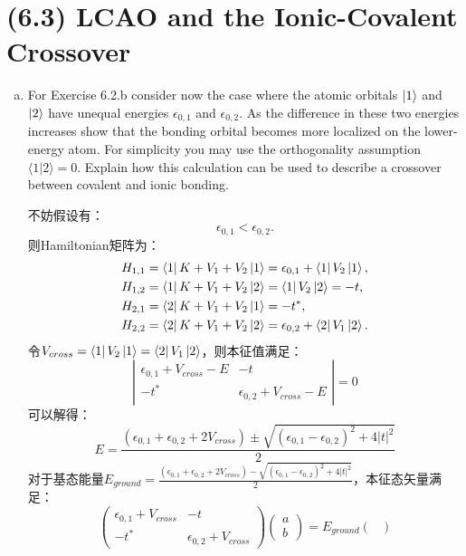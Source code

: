 \documentclass[reqno,a4paper,12pt]{amsart}
\begin{document}
\section{\textbf{(6.3) LCAO and the Ionic-Covalent Crossover}}
\begin{enumerate}[(a)]
	\item For Exercise 6.2.b consider now the case where the atomic orbitals $\ket{1}$ and $\ket{2}$ have unequal energies $\epsilon_{0,1}$ and $\epsilon_{0,2}$. As the difference in these two energies increases show that the bonding orbital becomes more localized on the lower-energy atom. For simplicity you may use the orthogonality assumption $\langle 1 \vert 2 \rangle = 0$. Explain how this calculation can be used to describe a crossover between covalent and ionic bonding. 
	\begin{tcolorbox}[breakable, colback = black!5!white, colframe = black]
	不妨假设有：
	\[
		\epsilon_{0,1} < \epsilon_{0,2}.
	\]
	则Hamiltonian矩阵为：
	\begin{align*}
		H_{1,1} &= \bra{1} K + V_1 + V_2 \ket{1} = \epsilon_{0,1} + \bra{1} V_2 \ket{1}, \\
		H_{1,2} &= \bra{1} K + V_1 + V_2 \ket{2} = \bra{1} V_2 \ket{2} = -t, \\
		H_{2,1} &= \bra{2} K + V_1 + V_2 \ket{1} = -t^*, \\
		H_{2,2} &= \bra{2} K + V_1 + V_2 \ket{2} = \epsilon_{0,2} + \bra{2} V_1 \ket{2}.
	\end{align*}
	令$V_{cross} = \bra{1} V_2 \ket{1} = \bra{2} V_1 \ket{2}$，则本征值满足：
	\[
		\left\vert \begin{matrix}
			\epsilon_{0,1} + V_{cross} - E & -t \\
			-t^* & \epsilon_{0,2} + V_{cross} - E
		\end{matrix}\right\vert = 0
	\]
	可以解得：
	\[
		E = \frac{(\epsilon_{0,1}+\epsilon_{0,2}+2V_{cross}) \pm \sqrt{(\epsilon_{0,1} - \epsilon_{0,2})^2 + 4\vert t \vert^2}}{2}
	\]
	对于基态能量$E_{ground} = \frac{(\epsilon_{0,1}+\epsilon_{0,2}+2V_{cross}) - \sqrt{(\epsilon_{0,1} - \epsilon_{0,2})^2 + 4\vert t \vert^2}}{2}$，本征态矢量满足：
	\[
		\begin{pmatrix}
			\epsilon_{0,1} + V_{cross} & -t \\
			-t^* & \epsilon_{0,2} + V_{cross}
		\end{pmatrix}
		\begin{pmatrix}
			a \\
			b
		\end{pmatrix}
		= E_{ground}\begin{pmatrix}

\end{pmatrix}\]
\end{tcolorbox}
\end{enumerate}
\end{document}
